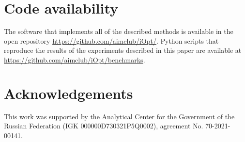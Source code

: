 \documentclass[preprint,12pt]{elsarticle}
\begin{document}
\section*{Code availability}
The software that implements all of the described methods is available in the open repository \url{https://github.com/aimclub/iOpt/}.
Python scripts that reproduce the results of the experiments described in this paper are available at \url{https://github.com/aimclub/iOpt/benchmarks}.

\section*{Acknowledgements}
This work was supported by the Analytical Center for the Government of the Russian Federation (IGK 000000D730321P5Q0002), agreement No. 70-2021-00141.




 






\end{document}
